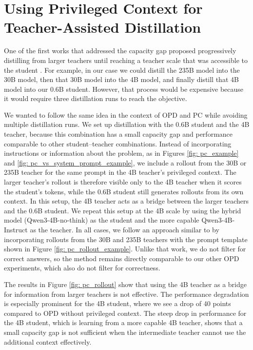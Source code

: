 \FloatBarrier

\section{Using Privileged Context for Teacher-Assisted Distillation} \label{sec: exps_teacher_assisted_pc}

One of the first works that addressed the capacity gap proposed progressively distilling from larger teachers until reaching a teacher scale that was accessible to the student \cite{mirzadehImprovedKnowledgeDistillation2019}. For example, in our case we could distill the 235B model into the 30B model, then that 30B model into the 4B model, and finally distill that 4B model into our 0.6B student. However, that process would be expensive because it would require three distillation runs to reach the objective.

We wanted to follow the same idea in the context of OPD and PC while avoiding multiple distillation runs. We set up distillation with the 0.6B student and the 4B teacher, because this combination has a small capacity gap and performance comparable to other student--teacher combinations. Instead of incorporating instructions or information about the problem, as in Figures \ref{fig: pc_example} and \ref{fig: pc_vs_system_prompt_example}, we include a rollout from the 30B or 235B teacher for the same prompt in the 4B teacher's privileged context. The larger teacher's rollout is therefore visible only to the 4B teacher when it scores the student's tokens, while the 0.6B student still generates rollouts from its own context. In this setup, the 4B teacher acts as a bridge between the larger teachers and the 0.6B student. We repeat this setup at the 4B scale by using the hybrid model (Qwen3-4B-no-think) as the student and the more capable Qwen3-4B-Instruct as the teacher. In all cases, we follow an approach similar to \cite{shenfeldSelfDistillationEnablesContinual2026} by incorporating rollouts from the 30B and 235B teachers with the prompt template shown in Figure \ref{fig: pc_rollout_example}. Unlike that work, we do not filter for correct answers, so the method remains directly comparable to our other OPD experiments, which also do not filter for correctness.

The results in Figure \ref{fig: pc_rollout} show that using the 4B teacher as a bridge for information from larger teachers is not effective. The performance degradation is especially prominent for the 4B student, where we see a drop of 40 points compared to OPD without privileged context. The steep drop in performance for the 4B student, which is learning from a more capable 4B teacher, shows that a small capacity gap is not sufficient when the intermediate teacher cannot use the additional context effectively.

